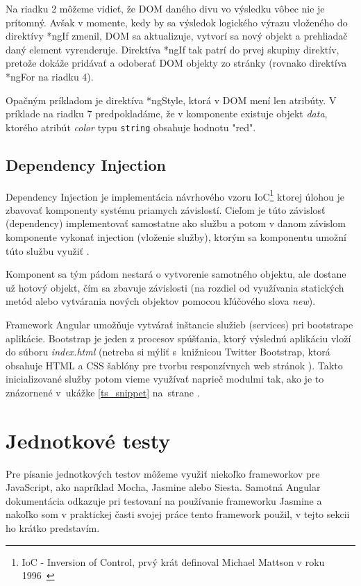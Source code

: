 \documentclass[
  digital, %
  twoside, %
  notable,   %
  nolof,   %
  nolot,   %
]{fithesis3}
\begin{document}
Na riadku 2 môžeme vidieť, že DOM daného divu vo výsledku vôbec nie je prítomný. Avšak v momente, kedy by sa výsledok logického výrazu vloženého do direktívy *ngIf zmenil, DOM sa aktualizuje, vytvorí sa nový objekt a prehliadač daný element vyrenderuje. Direktíva *ngIf tak patrí do prvej skupiny direktív, pretože dokáže pridávať a odoberať DOM objekty zo stránky (rovnako direktíva *ngFor na riadku 4).

Opačným príkladom je direktíva *ngStyle, ktorá v DOM mení len atribúty. V príklade na riadku 7 predpokladáme, že v komponente existuje objekt \textit{data}, ktorého atribút \textit{color} typu \texttt{string} obsahuje hodnotu "red".

\subsection{Dependency Injection}
\label{sec_di}
Dependency Injection je implementácia návrhového vzoru IoC\footnote{IoC - Inversion of Control, prvý krát definoval Michael Mattson v roku 1996~\cite{mattsson1996object}} ktorej úlohou je zbavovať komponenty systému priamych závislostí. Cieľom je túto závislosť (dependency) implementovať samostatne ako službu a potom v danom závislom komponente vykonať injection (vloženie služby), ktorým sa komponentu umožní túto službu využiť \cite{chiba2005aspect, yang2008empirical}.

Komponent sa tým pádom nestará o vytvorenie samotného objektu, ale dostane už hotový objekt, čím sa zbavuje závislosti (na rozdiel od využívania statických metód alebo vytvárania nových objektov pomocou kľúčového slova \textit{new}).

Framework Angular umožňuje vytvárať inštancie služieb (services) pri bootstrape aplikácie. Bootstrap je jeden z procesov spúšťania, ktorý výslednú aplikáciu vloží do súboru \textit{index.html} \cite{angular} (netreba si mýliť s~knižnicou Twitter Bootstrap, ktorá obsahuje HTML a CSS šablóny pre tvorbu responzívnych web stránok \cite{peska2017thesis}). Takto inicializované služby potom vieme využívať naprieč modulmi tak, ako je to znázornené v~ukážke \ref{ts_snippet} na~strane \pageref{ts_snippet}.

\section{Jednotkové testy}
Pre písanie jednotkových testov môžeme využiť niekoľko frameworkov pre JavaScript, ako napríklad Mocha, Jasmine alebo Siesta. Samotná Angular dokumentácia \cite{angular} odkazuje pri testovaní na používanie frameworku Jasmine a nakoľko som v praktickej časti svojej práce tento framework použil, v tejto sekcii ho krátko predstavím.
\end{document}
